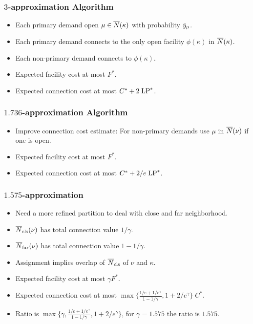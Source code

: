 \documentclass[handout, hyperref, xcolor=dvipsnames]{beamer}
\begin{document}
\begin{frame}
  \frametitle{$3$-approximation Algorithm}
  \begin{itemize}
  \item Each primary demand open $\mu\in {\overline{N}}(\kappa)$ with probability
    ${\bar y}_{\mu}$.
  \item Each primary demand connects to the only open facility
    $\phi(\kappa)$ in ${\overline{N}}(\kappa)$.
  \item Each non-primary demand connects to $\phi(\kappa)$.
  \item Expected facility cost at most $F^\ast$.
  \item Expected connection cost at most $C^\ast + 2\;\mbox{\rm LP}^\ast$.
  \end{itemize}
\end{frame}

\begin{frame}
  \frametitle{$1.736$-approximation Algorithm}
  \begin{itemize}
  \item Improve connection cost estimate: For non-primary demands use
    $\mu$ in ${\overline{N}}(\nu)$ if one is open.
  \item Expected facility cost at most $F^\ast$.
  \item Expected connection cost at most $C^\ast + 2/e\;\mbox{\rm LP}^\ast$.
  \end{itemize}
\end{frame}

\begin{frame}
  \frametitle{$1.575$-approximation}
  \begin{itemize}
  \item Need a more refined partition to deal with close and far
    neighborhood.
  \item ${\overline{N}}_{{\mbox{\scriptsize\rm cls}}}(\nu)$ has total connection value $1/\gamma$.
  \item ${\overline{N}}_{{\mbox{\scriptsize\rm far}}}(\nu)$ has total connection value $1-1/\gamma$.
  \item Assignment implies overlap of ${\overline{N}}_{{\mbox{\scriptsize\rm cls}}}$ of $\nu$ and
    $\kappa$.
  \item Expected facility cost at most $\gamma F^\ast$.
  \item Expected connection cost at most
    $\max\{\frac{1/e+1/e^\gamma}{1-1/\gamma}, 1+2/e^\gamma\}\; C^\ast$.
  \item Ratio is $\max\{\gamma, \frac{1/e+1/e^\gamma}{1-1/\gamma},
    1+2/e^\gamma\}$, for $\gamma=1.575$ the ratio is $1.575$.
  \end{itemize}
\end{frame}
\end{document}
